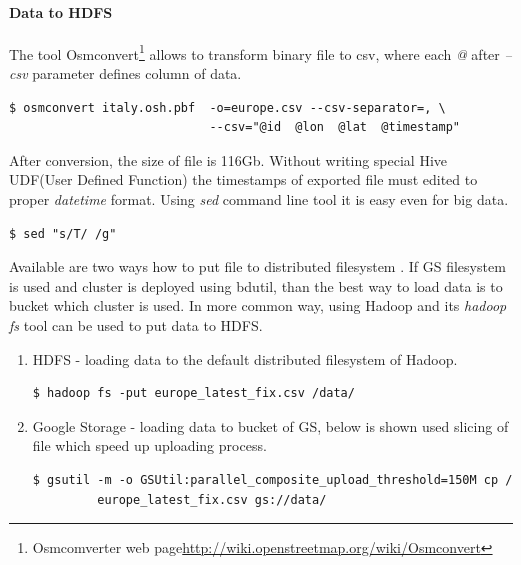 \documentclass[a4paper,12pt,oneside]{report}
\begin{document}
\paragraph{Data to HDFS}
	 The tool Osmconvert\footnote{Osmcomverter web
	page\url{http://wiki.openstreetmap.org/wiki/Osmconvert}} allows to transform
	binary file to csv,  where each 	\textit{@} after \textit{--csv} parameter
	defines column of data.
	\begin{footnotesize}
		\begin{lstlisting}[style=python]
$ osmconvert italy.osh.pbf  -o=europe.csv --csv-separator=, \
                            --csv="@id  @lon  @lat  @timestamp"
		\end{lstlisting}
	\end{footnotesize}
	 After conversion, the size of file is 116Gb. Without writing special Hive
	UDF(User Defined Function) the timestamps of exported file must edited to proper
	\textit{datetime} format. Using \textit{sed} command line tool it is easy even
	for big data.
	\begin{footnotesize}
		\begin{lstlisting}[style=python]
$ sed "s/T/ /g"
		\end{lstlisting}
	\end{footnotesize}
	 	Available are two ways how to put file to distributed filesystem . If GS
	filesystem is used and cluster is deployed using bdutil, than the best way to
	load data is to bucket which cluster is used. 
	In more common way, using Hadoop and
	its \textit{hadoop fs} tool can be used to put data to HDFS.
\begin{enumerate}
\item HDFS  - loading data to the default distributed filesystem of Hadoop.
	\begin{footnotesize}
		\begin{lstlisting}[style=python]
$ hadoop fs -put europe_latest_fix.csv /data/
		\end{lstlisting}
	\end{footnotesize}
\item Google Storage - loading data to bucket of GS, below is shown used slicing of
file which speed up uploading process.
	\begin{footnotesize}
		\begin{lstlisting}[style=python]
$ gsutil -m -o GSUtil:parallel_composite_upload_threshold=150M cp /
		 europe_latest_fix.csv gs://data/
		\end{lstlisting}
	\end{footnotesize}
\end{enumerate}
\end{document}
